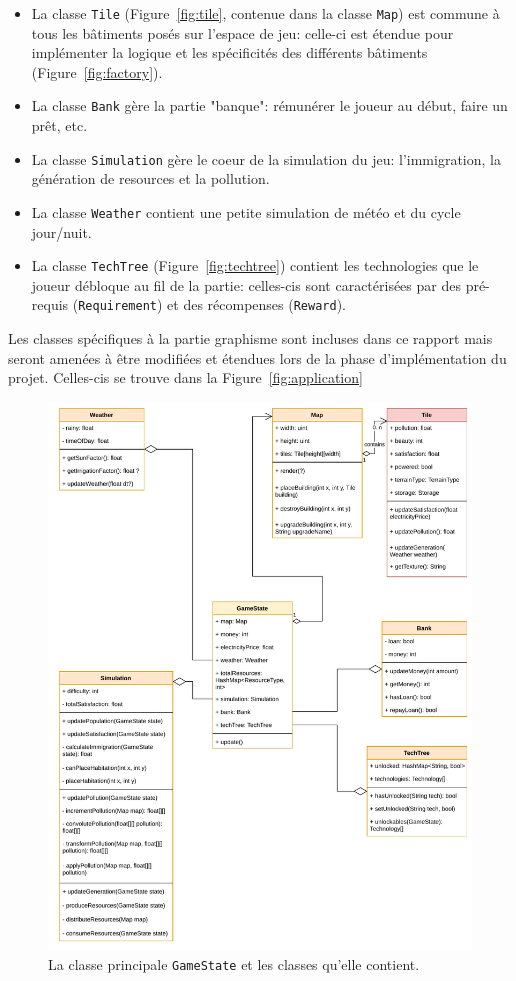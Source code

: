 \documentclass[12pt]{article}
\begin{document}
\begin{itemize}
    \item La classe \texttt{Tile} (Figure~\ref{fig:tile}, contenue dans la classe \texttt{Map}) est commune à tous les bâtiments posés sur l'espace de jeu: celle-ci est étendue pour implémenter la logique et les spécificités des différents bâtiments (Figure~\ref{fig:factory}).
    \item La classe \texttt{Bank} gère la partie "banque": rémunérer le joueur au début, faire un prêt, etc.
    \item La classe \texttt{Simulation} gère le coeur de la simulation du jeu: l'immigration, la génération de resources et la pollution.
    \item La classe \texttt{Weather} contient une petite simulation de météo et du cycle jour/nuit.
    \item La classe \texttt{TechTree} (Figure~\ref{fig:techtree}) contient les technologies que le joueur débloque au fil de la partie: celles-cis sont caractérisées par des pré-requis (\texttt{Requirement}) et des récompenses (\texttt{Reward}).
\end{itemize}

Les classes spécifiques à la partie graphisme sont incluses dans ce rapport mais seront amenées à être modifiées et étendues lors de la phase d'implémentation du projet. Celles-cis se trouve dans la Figure~\ref{fig:application}

\begin{figure}[H]
\includegraphics[width=\textwidth]{uml-classes-Page-2}
\caption{La classe principale \texttt{GameState} et les classes qu'elle contient.\label{fig:gamestate}}
\end{figure}
\end{document}
